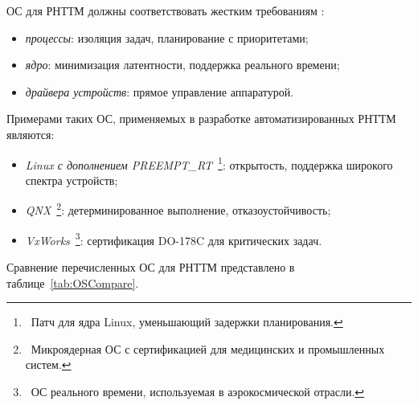 ОС для РНТТМ должны соответствовать жестким требованиям \cite{confbib3, bib1}:
\begin{itemize}[beginpenalty=10000, midpenalty=10000, wide=\parindent, leftmargin=0pt]
	\item \textit{процессы}: изоляция задач, планирование с приоритетами;
	\item \textit{ядро}: минимизация латентности, поддержка реального времени;
	\item \textit{драйвера устройств}: прямое управление аппаратурой.
\end{itemize}

Примерами таких ОС, применяемых в разработке автоматизированных РНТТМ являются:

\begin{itemize}[beginpenalty=10000, midpenalty=10000, wide=\parindent, leftmargin=0pt]
	\item \textit{Linux с дополнением PREEMPT\_RT}\ \footnote{\ Патч для ядра Linux, уменьшающий задержки планирования.}: открытость, поддержка широкого спектра устройств;
	\item \textit{QNX}\ \footnote{\ Микроядерная ОС с сертификацией для медицинских и промышленных систем.}: детерминированное выполнение, отказоустойчивость;
	\item \textit{VxWorks}\ \footnote{\ ОС реального времени, используемая в аэрокосмической отрасли.}: сертификация DO-178C для критических задач.
\end{itemize}

Сравнение перечисленных ОС для РНТТМ представлено в таблице\ \cref{tab:OSCompare}.

\begin{table}[htbp]
	\centering
	\caption{Сравнение ОС для РНТТМ}\label{tab:OSCompare}
\end{table}

